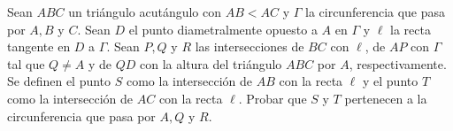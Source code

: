 Sean $A B C$ un triángulo acutángulo con $A B\lt A C$ y $\Gamma$ la circunferencia que pasa por $A, B$ y $C$. Sean $D$ el punto diametralmente opuesto a $A$ en $\Gamma$ y $\ell$ la recta tangente en $D$ a $\Gamma$. Sean $P, Q$ y $R$ las intersecciones de $B C$ con $\ell$, de $A P$ con $\Gamma$ tal que $Q \neq A$ y de $Q D$ con la altura del triángulo $A B C$ por $A$, respectivamente. Se definen el punto $S$ como la intersección de $A B$ con la recta $\ell$ y el punto $T$ como la intersección de $A C$ con la recta $\ell$. Probar que $S$ y $T$ pertenecen a la circunferencia que pasa por $A, Q$ y $R$.